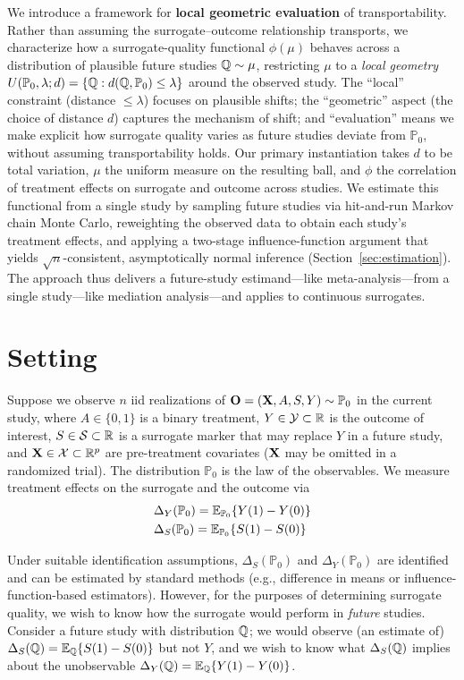 \documentclass{article}
\newcommand{\PP}{\mathbb{P}}
\begin{document}
We introduce a framework for \textbf{local geometric evaluation} of transportability. Rather than assuming the surrogate--outcome relationship transports, we characterize how a surrogate-quality functional $\phi(\mu)$ behaves across a distribution of plausible future studies $\mathbb{Q} \sim \mu$, restricting $\mu$ to a \emph{local geometry} $U(\PP_0, \lambda; d) = \{\Q : d(\Q, \PP_0) \leq \lambda\}$ around the observed study. The ``local'' constraint (distance $\leq \lambda$) focuses on plausible shifts; the ``geometric'' aspect (the choice of distance $d$) captures the mechanism of shift; and ``evaluation'' means we make explicit how surrogate quality varies as future studies deviate from $\PP_0$, without assuming transportability holds. Our primary instantiation takes $d$ to be total variation, $\mu$ the uniform measure on the resulting ball, and $\phi$ the correlation of treatment effects on surrogate and outcome across studies. We estimate this functional from a single study by sampling future studies via hit-and-run Markov chain Monte Carlo, reweighting the observed data to obtain each study's treatment effects, and applying a two-stage influence-function argument that yields $\sqrt{n}$-consistent, asymptotically normal inference (Section~\ref{sec:estimation}). The approach thus delivers a future-study estimand---like meta-analysis---from a single study---like mediation analysis---and applies to continuous surrogates.


\section{Setting}\label{sec:setting}
Suppose we observe $n$ iid realizations of $\bO = (\bX, A, S, Y) \sim \PP_0$ in the current study, where $A \in \{0, 1\}$ is a binary treatment, $Y \in \mathcal{Y} \subset \mathbb{R}$ is the outcome of interest, $S \in \mathcal{S} \subset \mathbb{R}$ is a surrogate marker that may replace $Y$ in a future study, and $\mathbf{X} \in \mathcal{X} \subset \mathbb{R}^p$ are pre-treatment covariates ($\mathbf{X}$ may be omitted in a randomized trial). The distribution $\PP_0$ is the law of the observables. We measure treatment effects on the surrogate and the outcome via
\begin{align*}
    &\Delta_Y(\PP_0) = \E_{\PP_0}\{Y(1) - Y(0)\}\\
    &\Delta_S(\PP_0) = \E_{\PP_0}\{S(1) - S(0)\}
\end{align*}

Under suitable identification assumptions, $\Delta_S(\PP_0)$ and $\Delta_Y(\PP_0)$ are identified and can be estimated by standard methods (e.g., difference in means or influence-function-based estimators). However, for the purposes of determining surrogate quality, we wish to know how the surrogate would perform in \emph{future} studies. Consider a future study with distribution $\mathbb{Q}$; we would observe (an estimate of) $\Delta_S(\mathbb{Q}) = \mathbb{E}_{\mathbb{Q}}\{S(1) - S(0)\}$ but not $Y$, and we wish to know what $\Delta_S(\mathbb{Q})$ implies about the unobservable $\Delta_Y(\mathbb{Q}) = \mathbb{E}_{\mathbb{Q}}\{Y(1) - Y(0)\}$.
\end{document}
